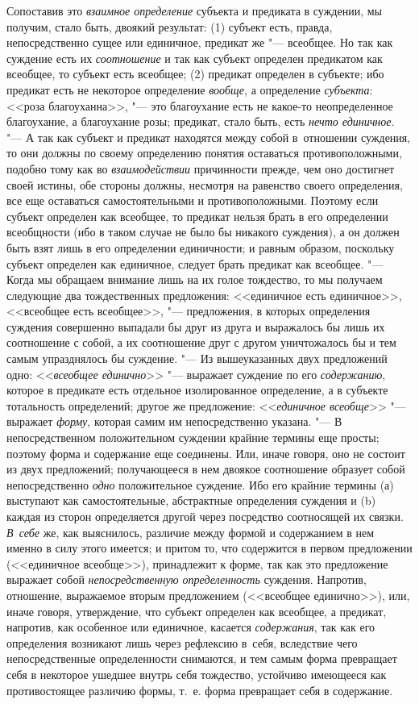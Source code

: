 Сопоставив это {\em взаимное определение} субъекта и предиката в суждении, мы
получим, стало быть, двоякий результат: (1) субъект есть, правда,
непосредственно сущее или единичное, предикат же "--- всеобщее. Но так как
суждение есть их {\em соотношение} и так как субъект определен предикатом как
всеобщее, то субъект есть всеобщее; (2) предикат определен в субъекте; ибо
предикат есть не некоторое определение {\em вообще}, а определение
{\em субъекта}: <<роза благоуханна>>, "--- это благоухание есть не какое-то
неопределенное благоухание, а благоухание розы; предикат, стало быть, есть
{\em нечто единичное}. "--- А так как субъект и предикат находятся между собой
в~отношении суждения, то они должны по своему определению понятия оставаться
противоположными, подобно тому как во {\em взаимодействии}
причинности прежде, чем оно достигнет своей истины, обе
стороны должны, несмотря на равенство своего определения, все еще
оставаться самостоятельными и противоположными. Поэтому если субъект
определен как всеобщее, то предикат нельзя брать в его определении
всеобщности (ибо в таком случае не было бы никакого
суждения), а он должен быть взят лишь в его определении
единичности; и равным образом, поскольку субъект определен как единичное,
следует брать предикат как всеобщее. "--- Когда мы обращаем
внимание лишь на их голое тождество, то мы получаем следующие два
тождественных предложения:\label{bkm:bm35a}
<<единичное есть единичное>>, <<всеобщее есть всеобщее>>, "--- предложения,
в которых определения суждения совершенно выпадали бы друг из друга и
выражалось бы лишь их соотношение с собой, а их соотношение друг с другом
уничтожалось бы и тем самым упразднялось бы суждение. "--- Из
вышеуказанных двух предложений одно: <<{\em всеобщее единично}>> "---
выражает суждение по его {\em содержанию}, которое
в предикате есть отдельное изолированное определение, а в субъекте
тотальность определений; другое же предложение:
<<{\em единичное всеобще}>> "--- выражает {\em форму},
которая самим им непосредственно указана. "---
В непосредственном положительном суждении крайние термины
еще просты; поэтому форма и содержание еще соединены. Или, иначе говоря,
оно не состоит из двух предложений; получающееся в нем двоякое соотношение
образует собой непосредственно {\em одно} положительное
суждение. Ибо его крайние термины (а) выступают как самостоятельные,
абстрактные определения суждения и (b) каждая из сторон определяется другой
через посредство соотносящей их связки. {\em В~себе} же, как
выяснилось, различие между формой и содержанием в нем именно в силу этого
имеется; и притом то, что содержится в первом предложении (<<единичное
всеобще>>), принадлежит к форме, так как это предложение выражает собой
{\em непосредственную определенность} суждения. Напротив, отношение,
выражаемое вторым предложением (<<всеобщее единично>>), или, иначе говоря,
утверждение, что субъект определен как всеобщее, а предикат, напротив, как
особенное или единичное, касается {\em содержания}, так как его определения
возникают лишь через рефлексию в~себя, вследствие чего непосредственные
определенности снимаются, и тем самым форма превращает себя в некоторое ушедшее
внутрь себя тождество, устойчиво имеющееся как противостоящее различию формы,
т.~е. форма превращает себя в содержание.

